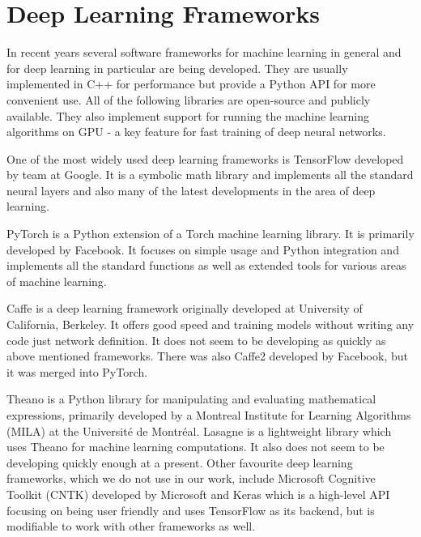 \section{Deep Learning Frameworks}
In recent years several software frameworks for machine learning in general and for deep learning in particular are being developed. They are usually implemented in C++ for performance but provide a Python API for more convenient use. All of the following libraries are open-source and publicly available. They also implement support for running the machine learning algorithms on GPU - a key feature for fast training of deep neural networks. \par
One of the most widely used deep learning frameworks is TensorFlow \cite{martin_abadi_tensorflow:_2015} developed by team at Google. It is a symbolic math library and implements all the standard neural layers and also many of the latest developments in the area of deep learning.  \par
PyTorch \cite{paszke_automatic_2017} is a Python extension of a Torch machine learning library. It is primarily developed by Facebook. It focuses on simple usage and Python integration and implements all the standard functions as well as extended tools for various areas of machine learning. \par
Caffe \cite{jia_caffe:_2014} is a deep learning framework originally developed at University of California, Berkeley. It offers good speed and training models without writing any code just network definition. It does not seem to be developing as quickly as above mentioned frameworks. There was also Caffe2 developed by Facebook, but it was merged into PyTorch. \par
Theano \cite{al-rfou_theano:_2016} is a Python library for manipulating and evaluating mathematical expressions, primarily developed by a Montreal Institute for Learning Algorithms (MILA) at the Université de Montréal. Lasagne \cite{dieleman_lasagne:_2015} is a lightweight library which uses Theano for machine learning computations. It also does not seem to be developing quickly enough at a present. 
Other favourite deep learning frameworks, which we do not use in our work, include Microsoft Cognitive Toolkit (CNTK) \cite{seide_cntk:_2016} developed by Microsoft and Keras \cite{chollet_keras_2015} which is a high-level API focusing on being user friendly and uses TensorFlow as its backend, but is modifiable to work with other frameworks as well.

